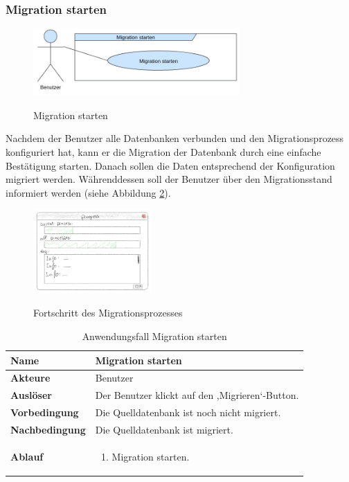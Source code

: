 \subsubsection*{Migration starten}
\begin{figure}[H]
	\caption{Migration starten}
	\centering
	\includegraphics[width=0.7\textwidth]{images/af/af-mg-starten}
	\label{img:af-mg-starten}
\end{figure}
Nachdem der Benutzer alle Datenbanken verbunden und den Migrationsprozess konfiguriert hat, kann er die Migration der Datenbank durch eine einfache Bestätigung starten. Danach sollen die Daten entsprechend der Konfiguration migriert werden. Währenddessen soll der Benutzer über den Migrationsstand informiert werden (siehe Abbildung \ref{img:progressview}).
\begin{figure}[H]
	\caption{Fortschritt des Migrationsprozesses}
	\centering
	\includegraphics[width=0.4\textwidth]{images/progressview}
	\label{img:progressview}
\end{figure}
\begin{table}[H]
	\centering
	\begin{tabular}{ |p{4cm}|p{8cm}| }
		\hline
		\textbf{Name} & Migration starten  \\
		\hline
		\textbf{Akteure} & Benutzer  \\
		\hline
		\textbf{Auslöser} & Der Benutzer klickt auf den ,Migrieren‘-Button. \\
		\hline
		\textbf{Vorbedingung} & Die Quelldatenbank ist noch nicht migriert.  \\
		\hline
		\textbf{Nachbedingung} & Die Quelldatenbank ist migriert.  \\
		\hline
		\textbf{Ablauf} &  
		\begin{enumerate}
			\item Migration starten.
		\end{enumerate}  \\
		\hline
		
	\end{tabular}
	\caption{Anwendungsfall Migration starten}
	\label{table:migration-starten}
\end{table}


